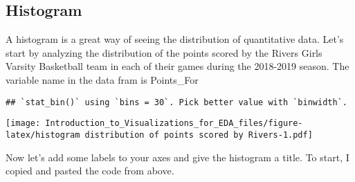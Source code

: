 \documentclass[]{article}
\newenvironment{Shaded}{\begin{snugshade}}{\end{snugshade}}
\newcommand{\DataTypeTok}[1]{\textcolor[rgb]{0.13,0.29,0.53}{#1}}
\newcommand{\KeywordTok}[1]{\textcolor[rgb]{0.13,0.29,0.53}{\textbf{#1}}}
\newcommand{\NormalTok}[1]{#1}
\newcommand{\OperatorTok}[1]{\textcolor[rgb]{0.81,0.36,0.00}{\textbf{#1}}}
\newcommand{\StringTok}[1]{\textcolor[rgb]{0.31,0.60,0.02}{#1}}
\begin{document}
\hypertarget{histogram}{%
\subsection{Histogram}\label{histogram}}

A histogram is a great way of seeing the distribution of quantitative
data. Let's start by analyzing the distribution of the points scored by
the Rivers Girls Varsity Basketball team in each of their games during
the 2018-2019 season. The variable name in the data fram is Points\_For

\begin{Shaded}
\end{Shaded}

\begin{verbatim}
## `stat_bin()` using `bins = 30`. Pick better value with `binwidth`.
\end{verbatim}

\texttt{[image: Introduction\_to\_Visualizations\_for\_EDA\_files/figure-latex/histogram distribution of points scored by Rivers-1.pdf]}

Now let's add some labels to your axes and give the histogram a title.
To start, I copied and pasted the code from above.

\begin{Shaded}
\end{Shaded}
\end{document}
